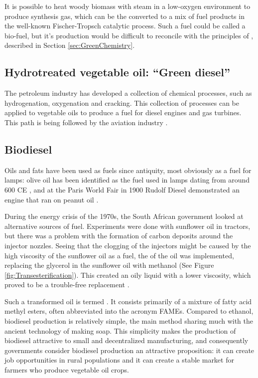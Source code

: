 It is possible to heat woody biomass with steam in a low-oxygen environment to
produce synthesis gas, which can be the converted to a mix of fuel products in
the well-known Fischer-Tropsch catalytic process. Such a  fuel could be called a
bio-fuel, but it's production would be difficult to reconcile with the
principles of , described in Section
\ref{sec:GreenChemistry}.

\subsection{Hydrotreated vegetable oil: ``Green diesel''}
\label{sec:GreenDiesel}

The petroleum industry has developed a collection of chemical processes, such as
hydrogenation, oxygenation and cracking. This collection of processes can be
applied to vegetable oils to produce a fuel for diesel engines and gas turbines.
This path is being followed by the aviation industry \autocite{Chiaramonti2014}.

\subsection{Biodiesel}

Oils and fats have been used as fuels since antiquity, most obviously as a fuel
for lamps: olive oil has been identified as the fuel used in lamps dating from
around 600 CE \autocite{Kimpe2001}, and at the Paris World Fair in 1900 Rudolf
Diesel demonstrated an engine that ran on peanut oil \autocite{Knothe2010}.

During the energy crisis of the 1970s, the South African government looked at
alternative sources of fuel. Experiments were done with sunflower oil in
tractors, but there was a problem with the formation of carbon deposits around
the injector nozzles. Seeing that the clogging of the injectors might be caused
by the high viscosity of the sunflower oil as a fuel, the
 of the oil was implemented, replacing the glycerol
in the sunflower oil with methanol (See Figure \ref{fig:Transesterification}).
This created an oily liquid with a lower viscosity, which proved to be a
trouble-free replacement \autocite{VanNiekerk1980}.

Such a transformed oil is termed . It consists primarily of a
mixture of fatty acid methyl esters, often abbreviated into the acronym FAMEs.
Compared to ethanol, biodiesel production is relatively simple, the main method
sharing much with the ancient technology of making soap. This simplicity makes
the production of biodiesel attractive to small and decentralized manufacturing,
and consequently governments consider biodiesel production an attractive
proposition: it can create job opportunities in rural populations and it can
create a stable market for farmers who produce vegetable oil crops.

